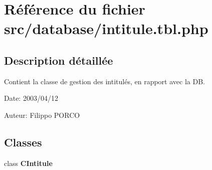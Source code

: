 \section{Référence du fichier src/database/intitule.tbl.php}
\label{intitule_8tbl_8php}


\subsection{Description détaillée}
Contient la classe de gestion des intitulés, en rapport avec la DB. 

\begin{Desc}
\item[Date:]2003/04/12\end{Desc}
\begin{Desc}
\item[Auteur:]Filippo PORCO \end{Desc}


\subsection*{Classes}
\begin{CompactItemize}
\item 
class \textbf{CIntitule}
\end{CompactItemize}

